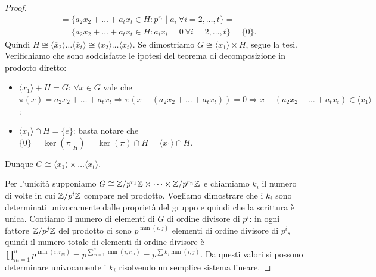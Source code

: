\begin{proof}
\begin{align}
    & = \{a_2 x_2+\dots+a_t x_t \in H : p^{r_i} \mid a_i \ \forall i = 2,\dots, t\}  = \nonumber \\
    & = \{a_2 x_2+\dots+a_t x_t \in H : a_i x_i =  0 \ \forall i = 2,\dots, t\} = \{0\}. \nonumber 
    \end{align}
    Quindi $H \cong \langle \overline x_2 \rangle \dots \langle \overline x_t \rangle \cong \langle x_2 \rangle \dots  \langle  x_t \rangle$. Se dimostriamo $G \cong \langle x_1 \rangle \times H$, segue la tesi. Verifichiamo che sono soddisfatte le ipotesi del teorema di decomposizione in prodotto diretto: 
    \begin{itemize}
    \item $\langle x_1 \rangle + H  = G$: $\forall x \in G$ vale che $\pi(x) = a_2\overline x_2 + \dots + a_t \overline x_t \Rightarrow \pi(x - (a_2 x_2 + \dots + a_t  x_t)) = \overline0 \Rightarrow x - (a_2 x_2 + \dots + a_t  x_t) \in \langle x_1 \rangle$;
    \item $\langle x_1 \rangle \cap H = \{e\}$: basta notare che $\{0\} = \ker(\pi|_H) = \ker(\pi) \cap H = \langle x_1 \rangle \cap H.$
    \end{itemize}
    Dunque $G \cong \langle x_1 \rangle \times \dots \langle x_t \rangle$.

    Per l'unicità supponiamo $G\cong\mathbb{Z}/p^{r_1}\mathbb{Z}\times\dots\times\mathbb{Z}/p^{r_n}\mathbb{Z}$ e chiamiamo $k_i$ il numero di volte in cui $\mathbb{Z}/p^i\mathbb{Z}$ compare nel prodotto. Vogliamo dimostrare che i $k_i$ sono determinati univocamente dalle proprietà del gruppo e quindi che la scrittura è unica.
    Contiamo il numero di elementi di $G$ di ordine divisore di $p^i$: in ogni fattore $\mathbb{Z}/p^j\mathbb{Z}$ del prodotto ci sono $p^{\min(i,j)}$ elementi di ordine divisore di $p^i$, quindi il numero totale di elementi di ordine divisore è $\prod_{m=1}^np^{\min(i,r_m)}=p^{\sum_{m=1}^n\min(i,r_m)}=p^{\sum k_j\min(i,j)}$. Da questi valori si possono determinare univocamente i $k_i$ risolvendo un semplice sistema lineare.
\end{proof}


